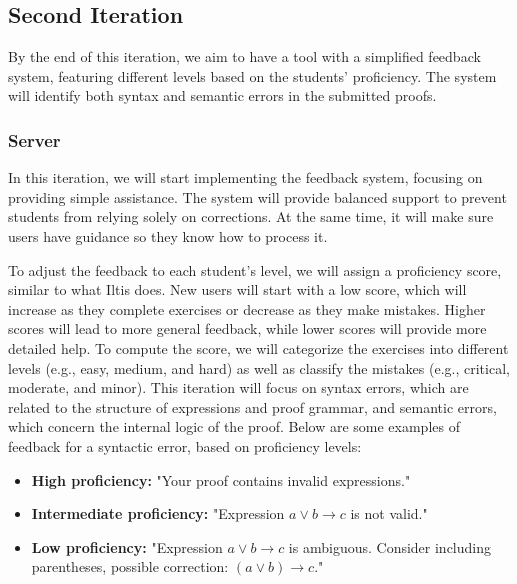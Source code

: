 \subsection{Second Iteration}
By the end of this iteration, we aim to have a tool with a simplified feedback system, featuring different levels based on the students' proficiency. The system will identify both syntax and semantic errors in the submitted proofs.

\subsubsection{Server}
In this iteration, we will start implementing the feedback system, focusing on providing simple assistance. The system will provide balanced support to prevent students from relying solely on corrections. At the same time, it will make sure users have guidance so they know how to process it. 

To adjust the feedback to each student's level, we will assign a proficiency score, similar to what Iltis does. New users will start with a low score, which will increase as they complete exercises or decrease as they make mistakes. Higher scores will lead to more general feedback, while lower scores will provide more detailed help. To compute the score, we will categorize the exercises into different levels (e.g., easy, medium, and hard) as well as classify the mistakes (e.g., critical, moderate, and minor). This iteration will focus on syntax errors, which are related to the structure of expressions and proof grammar, and semantic errors, which concern the internal logic of the proof. Below are some examples of feedback for a syntactic error, based on proficiency levels:
\begin{itemize}
    \item \textbf{High proficiency:} "Your proof contains invalid expressions."
    \item \textbf{Intermediate proficiency:} "Expression \(a \lor b \to c\) is not valid."
    \item \textbf{Low proficiency:} "Expression \(a \lor b \to c\) is ambiguous. Consider including parentheses, possible correction: \((a \lor b) \to c\)."
\end{itemize}


